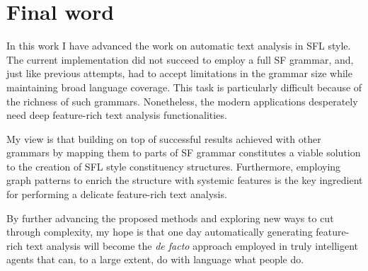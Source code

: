 \section{Final word}

    In this work I have advanced the work on automatic text analysis in SFL style. The current implementation did not succeed to employ a full SF grammar, and, just like previous attempts, had to accept limitations in the grammar size while maintaining broad language coverage. This task is particularly difficult because of the richness of such grammars. Nonetheless, the modern applications desperately need deep feature-rich text analysis functionalities. 
    
    My view is that building on top of successful results achieved with other grammars by mapping them to parts of SF grammar constitutes a viable solution to the creation of SFL style constituency structures. Furthermore, employing graph patterns to enrich the structure with systemic features is the key ingredient for performing a delicate feature-rich text analysis.
    
    By further advancing the proposed methods and exploring new ways to cut through complexity, my hope is that one day automatically generating feature-rich text analysis will become the \textit{de facto} approach employed in truly intelligent agents that can, to a large extent, do with language what people do.